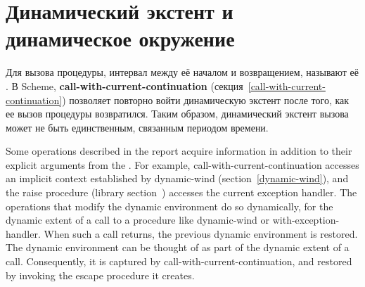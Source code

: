 \section{Динамический экстент и динамическое окружение}
\label{dynamicenvironmentsection}

Для вызова процедуры, интервал между её началом и возвращением,
называют её . В Scheme, {\cf\bfseries call-with-current-continuation}
(секция~\ref{call-with-current-continuation}) позволяет повторно войти динамическую экстент после
того, как ее вызов процедуры возвратился. Таким образом, динамический экстент вызова может не быть
единственным, связанным периодом времени.

Some operations described in the report acquire information in
addition to their explicit arguments from the .  For example, {\cf call-\hp{}with-\hp{}current-\hp{}continuation}
accesses an implicit context established
by {\cf dynamic-wind} (section~\ref{dynamic-wind}), and the {\cf
  raise} procedure (library
section~) accesses the
current exception handler.  The operations that modify the dynamic
environment do so dynamically, for the dynamic extent of a call to a
procedure like {\cf dynamic-wind} or {\cf with-exception-handler}.
When such a call returns, the previous dynamic environment is
restored.  The dynamic environment can be thought of as part of the
dynamic extent of a call.  Consequently, it is captured by {\cf
  call-with-current-continuation}, and restored by invoking the escape
procedure it creates.

